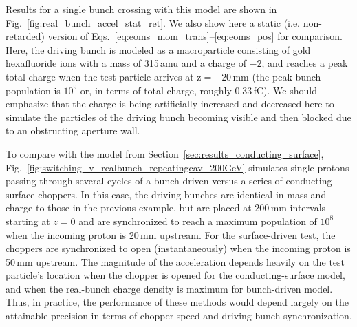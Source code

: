 \documentclass[reprint,
               amsmath,amssymb,nofootinbib, aps%
              ]{revtex4-2}
\begin{document}
Results for a single bunch crossing with this model are shown in Fig.~\ref{fig:real_bunch_accel_stat_ret}. We also show here a static (i.e. non-retarded) version of Eqs.~\ref{eq:eoms_mom_trans}--\ref{eq:eoms_pos} for comparison.
Here, the driving bunch is modeled as a macroparticle consisting of gold hexafluoride ions with a mass of 315\,amu and a charge of $-2$, and reaches a peak total charge when the test particle arrives at $\textrm{z}=-20$\,mm (the peak bunch population is $10^9$ or, in terms of total charge, roughly 0.33\,fC). We should emphasize that the charge is being artificially increased and decreased here to simulate the particles of the driving bunch becoming visible and then blocked due to an obstructing aperture wall.

To compare with the model from Section~\ref{sec:results_conducting_surface}, Fig.~\ref{fig:switching_v_realbunch_repeatingcav_200GeV} simulates single protons passing through several cycles of a bunch-driven versus a series of conducting-surface choppers. In this case, the driving bunches are identical in mass and charge to those in the previous example, but are placed at 200\,mm intervals starting at $z=0$ and are synchronized to reach a maximum population of $10^8$ when the incoming proton is 20\,mm upstream. For the surface-driven test, the choppers are synchronized to open (instantaneously) when the incoming proton is 50\,mm upstream. The magnitude of the acceleration depends heavily on the test particle's location when the chopper is opened for the conducting-surface model, and when the real-bunch charge density is maximum for bunch-driven model. Thus, in practice, the performance of these methods would depend largely on the attainable precision in terms of chopper speed and driving-bunch synchronization.
\end{document}
